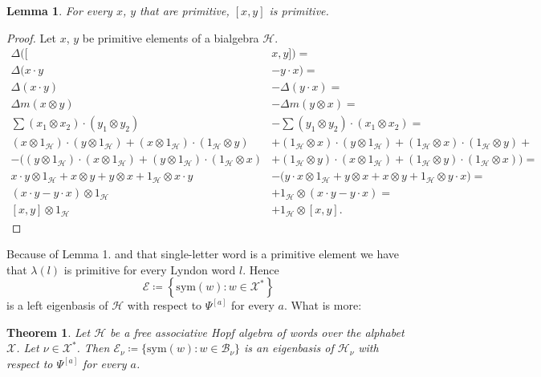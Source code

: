 \documentclass[a4paper, 12pt]{report}
\newtheorem{theorem}{Theorem}
\newtheorem{lemma}{Lemma}
\begin{document}
\begin{lemma}
For every $x$, $y$ that are primitive, $[x, y]$ is primitive.
\end{lemma}

\begin{proof}
Let $x$, $y$ be primitive elements of a bialgebra $\mathcal{H}$.
\begin{align*}
\Delta([&x, y]) = \\ \Delta(x\cdot y &- y\cdot x) =\\ \Delta (x\cdot y) &- \Delta(y\cdot x) =\\
\Delta m(x \otimes y) &- \Delta m(y \otimes x) =\\
\sum (x_1 \otimes x_2) \cdot (y_1 \otimes y_2) &- \sum (y_1 \otimes y_2) \cdot (x_1 \otimes x_2) = \\
(x \otimes 1_\mathcal{H}) \cdot (y \otimes 1_\mathcal{H}) + (x \otimes 1_\mathcal{H}) \cdot (1_\mathcal{H}
\otimes y)
&+ (1_\mathcal{H} \otimes x) \cdot (y \otimes 1_\mathcal{H}) + (1_\mathcal{H} \otimes x) \cdot
(1_\mathcal{H} \otimes y) + \\
- \Big((y \otimes 1_\mathcal{H}) \cdot (x \otimes 1_\mathcal{H}) + (y \otimes 1_\mathcal{H}) \cdot
(1_\mathcal{H} \otimes x)
&+ (1_\mathcal{H} \otimes y) \cdot (x \otimes 1_\mathcal{H}) + (1_\mathcal{H} \otimes y) \cdot
(1_\mathcal{H} \otimes x) \Big) = \\
x \cdot y \otimes 1_\mathcal{H} + x \otimes y + y \otimes x + 1_\mathcal{H} \otimes x \cdot y
&- \Big( y \cdot x \otimes 1_\mathcal{H} + y \otimes x + x \otimes y + 1_\mathcal{H} \otimes y \cdot x
\Big) = \\
(x \cdot y - y \cdot x) \otimes 1_\mathcal{H} &+ 1_\mathcal{H} \otimes (x \cdot y - y \cdot x) = \\
[x, y] \otimes 1_\mathcal{H} &+ 1_\mathcal{H} \otimes [x, y].
\end{align*}

\end{proof}

Because of Lemma 1. and that single-letter word is a primitive element we have that $\lambda(l)$ is
primitive
for every Lyndon word $l$. Hence
\begin{equation*}
\mathcal{E} \coloneqq\left\{\mathrm{sym}(w) : w \in \mathcal{X}^*\right\}
\end{equation*}
is a left eigenbasis of $\mathcal{H}$ with respect to $\Psi^{[a]}$ for every $a$. What is more:

\begin{theorem}
Let $\mathcal{H}$ be a free associative Hopf algebra of words over the alphabet $\mathcal{X}$.
Let $\nu \in \mathcal{X}^*$. Then $\mathcal{E}_\nu \coloneqq \{\mathrm{sym}(w) : w \in \mathcal{B}_\nu\}$ is
an eigenbasis of
$\mathcal{H}_\nu$ with respect to $\Psi^{[a]}$ for every $a$.
\end{theorem}
\end{document}
